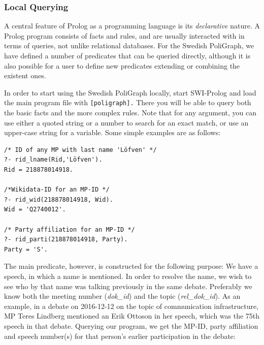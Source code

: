 \subsubsection{Local Querying}
\label{sec:querying}

A central feature of Prolog as a programming language is its \emph{declarative} nature. A Prolog program consists of facts and rules, and are usually interacted with in terms of queries, not unlike relational databases. For the Swedish PoliGraph, we have defined a number of predicates that can be queried directly, although it is also possible for a user to define new predicates extending or combining the existent ones.

In order to start using the Swedish PoliGraph locally, start SWI-Prolog and load the main program file with \texttt{[poligraph].} There you will be able to query both the basic facts and the more complex rules. Note that for any argument, you can use either a quoted string or a number to search for an exact match, or use an upper-case string for a variable. Some simple examples are as follows:

\begin{lstlisting}
/* ID of any MP with last name 'Löfven' */
?- rid_lname(Rid,'Löfven').
Rid = 218878014918.

/*Wikidata-ID for an MP-ID */
?- rid_wid(218878014918, Wid).
Wid = 'Q2740012'.

/* Party affiliation for an MP-ID */
?- rid_parti(218878014918, Party).
Party = 'S'.
\end{lstlisting}
%
The main predicate, however, is constructed for the following purpose: We have a speech, in which a name is mentioned. In order to resolve the name, we wish to see who by that name was talking previously in the same debate. Preferably we know both the meeting number (\emph{dok\_id}) and the topic (\emph{rel\_dok\_id}). As an example, in a debate on 2016-12-12 on the topic of communication infrastructure, MP Teres Lindberg mentioned an Erik Ottoson in her speech, which was the 75th speech in that debate. Querying our program, we get the MP-ID, party affiliation and speech number(s) for that person's earlier participation in the debate: %


